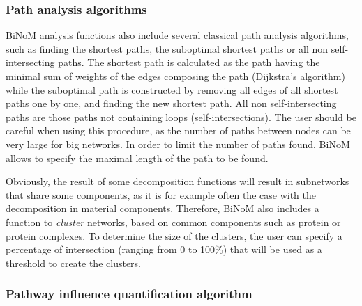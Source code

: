 \documentclass[10pt]{bmc_article}
\newenvironment{bmcformat}{\baselineskip20pt\sloppy\setboolean{publ}{false}}{\baselineskip20pt\sloppy}
\begin{document}
\begin{bmcformat}
\subsubsection*{Path analysis algorithms}

BiNoM analysis functions also include several classical path analysis
algorithms, such as finding the shortest paths, the suboptimal shortest paths or
all non self-intersecting paths. The shortest path is calculated as the path having
the minimal sum of weights of the edges composing the path (Dijkstra's
algorithm) while the suboptimal path is constructed by removing all edges of
all shortest paths one by one, and finding the new shortest path. All non self-intersecting paths 
are those paths not containing loops (self-intersections). 
The user should be careful when using this procedure, as the number of paths between nodes can be
very large for big networks. In order to limit the number of paths found, BiNoM
allows to specify the maximal length of the path to be found.

Obviously, the result of some decomposition functions will result in subnetworks
that share some components, as it is for example often the case
with the decomposition in material components. Therefore, BiNoM also includes a
function to \emph{cluster} networks, based on common components such as protein
or protein complexes. To determine the size of the clusters, the user can
specify a percentage of intersection (ranging from 0 to 100\%) that will be used
as a threshold to create the clusters.

\subsubsection*{Pathway influence quantification algorithm}


\end{bmcformat}
\end{document}
